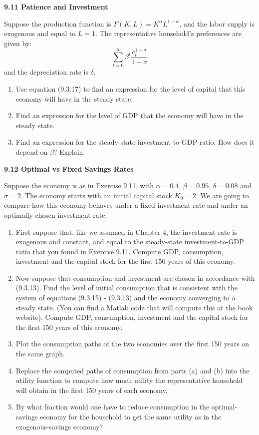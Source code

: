 \noindent\textbf{9.11 Patience and Investment}\par\noindent Suppose the production function is $F(K,L)=K^\alpha L^{1-\alpha}$, and the labor supply
is exogenous and equal to $L=1$. The representative household's preferences are given by:
\[
\sum_{t=0}^{\infty}\beta^t\frac{c_t^{1-\sigma}}{1-\sigma}
\]
and the depreciation rate is $\delta$.
\begin{enumerate}[label=(\alph*),leftmargin=2.2em,topsep=2pt,itemsep=1pt]
\item Use equation (9.3.17) to find an expression for the level of capital that this economy will have in the steady state.
\item Find an expression for the level of GDP that the economy will have in the steady state.
\item Find an expression for the steady-state investment-to-GDP ratio. How does it depend on $\beta$? Explain.
\end{enumerate}

\noindent\textbf{9.12 Optimal vs Fixed Savings Rates}\par\noindent Suppose the economy is as in Exercise 9.11, with $\alpha=0.4$, $\beta=0.95$, $\delta=0.08$
and $\sigma=2$. The economy starts with an initial capital stock $K_0=2$. We are going to compare how this economy behaves under a
fixed investment rate and under an optimally-chosen investment rate.
\begin{enumerate}[label=(\alph*),leftmargin=2.2em,topsep=2pt,itemsep=1pt]
\item First suppose that, like we assumed in Chapter 4, the investment rate is exogenous and constant, and equal to the steady-state
investment-to-GDP ratio that you found in Exercise 9.11. Compute GDP, consumption, investment and the capital stock for the first
150 years of this economy.
\item Now suppose that consumption and investment are chosen in accordance with (9.3.13). Find the level of initial consumption that
is consistent with the system of equations (9.3.15) - (9.3.13) and the economy converging to a steady state. (You can find a Matlab
code that will compute this at the book website). Compute GDP, consumption, investment and the capital stock for the first 150
years of this economy.
\item Plot the consumption paths of the two economies over the first 150 years on the same graph.
\item Replace the computed paths of consumption from parts (a) and (b) into the utility function to compute how much utility the
representative household will obtain in the first 150 years of each economy.
\item By what fraction would one have to reduce consumption in the optimal-savings economy for the household to get the same utility
as in the exogenous-savings economy?
\end{enumerate}

